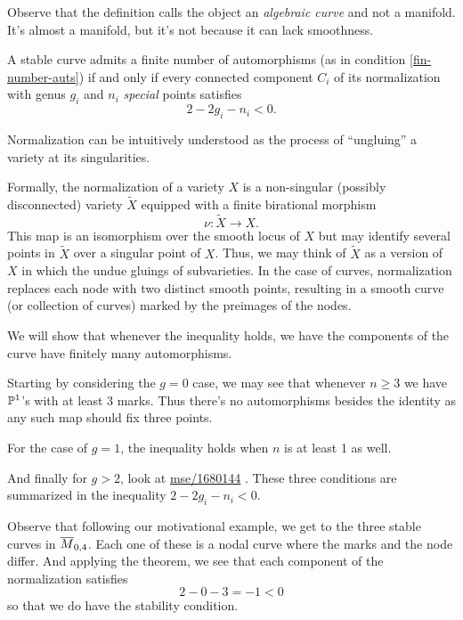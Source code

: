 \documentclass[12pt]{memoir}
\begin{document}
\begin{Rmk}
Observe that the definition calls the object an \emph{algebraic curve} and not a manifold. It's almost a manifold, but it's not because it can lack smoothness.
\end{Rmk}

\begin{Th}\label{th-stability-condition-22gn}
A stable curve admits a finite number of automorphisms (as in condition \ref{fin-number-auts}) if and only if every connected component $C_i$ of its normalization with genus $g_i$ and $n_i$ \emph{special} points satisfies 
$$2-2g_i-n_i<0.$$
\end{Th}

\begin{Rmk} %
Normalization can be intuitively understood as the process of ``ungluing'' a variety at its singularities.\par
Formally, the normalization of a variety $X$ is a non-singular (possibly disconnected) variety $\widetilde X$ equipped with a finite birational morphism 
$$\nu:\widetilde X\to X.$$
This map is an isomorphism over the smooth locus of $X$ but may identify several points in $\widetilde X$ over a singular point of $X$. Thus, we may think of $\widetilde X$ as a version of $X$ in which the undue gluings of subvarieties. In the case of curves, normalization replaces each node with two distinct smooth points, resulting in a smooth curve (or collection of curves) marked by the preimages of the nodes. 
\end{Rmk}

\begin{ptcb}
    We will show that whenever the inequality holds, we have the components of the curve have finitely many automorphisms.\par
    Starting by considering the $g=0$ case, we may see that whenever $n\geq 3$ we have $\mathbb{P}^1$'s with at least 3 marks. Thus there's no automorphisms besides the identity as any such map should fix three points.\par
    For the case of $g=1$, the inequality holds when $n$ is at least 1 as well. \par
    And finally for $g>2$, look at \href{https://math.stackexchange.com/questions/1680144/automorphism-group-of-genus-2-curve}{mse/1680144}
    .
    These three conditions are summarized in the inequality $2-2g_i-n_i<0$.
\end{ptcb}
\begin{Ex}
    Observe that following our motivational example, we get to the three stable curves in $\overline M_{0,4}$. Each one of these is a nodal curve where the marks and the node differ. And applying the theorem, we see that each component of the normalization satisfies
    $$2-0-3=-1<0$$
    so that we do have the stability condition. 
\end{Ex}
\end{document}
